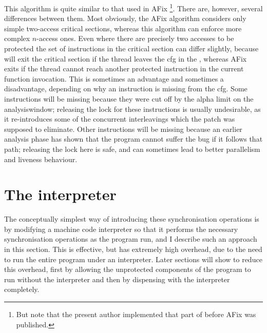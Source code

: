 This algorithm is quite similar to that used in AFix
\cite{Jin2011}\footnote{But note that the present author implemented
  that part of {\implementation} before AFix was published.}.  There
are, however, several differences between them.  Most obviously, the
AFix algorithm considers only simple two-access critical sections,
whereas this algorithm can enforce more complex $n$-access ones.  Even
where there are precisely two accesses to be protected the set of
instructions in the critical section can differ slightly, because
{\technique} will exit the critical section if the thread leaves the
\gls{cfg} in the {\StateMachine}, whereas AFix exits if the thread
cannot reach another protected instruction in the current function
invocation.  This is sometimes an advantage and sometimes a
disadvantage, depending on why an instruction is missing from the
{\StateMachine} \gls{cfg}.  Some instructions will be missing because
they were cut off by the \gls{alpha} limit on the
\gls{analysiswindow}; releasing the lock for these instructions is
usually undesirable, as it re-introduces some of the concurrent
interleavings which the patch was supposed to eliminate.  Other
instructions will be missing because an earlier analysis phase has
shown that the program cannot suffer the bug if it follows that path;
releasing the lock here is safe, and can sometimes lead to better
parallelism and liveness behaviour.

\section{The interpreter}

The conceptually simplest way of introducing these synchronisation
operations is by modifying a machine code interpreter so that it
performs the necessary synchronisation operations as the program run,
and I describe such an approach in this section.  This is effective,
but has extremely high overhead, due to the need to run the entire
program under an interpreter.  Later sections will show to reduce this
overhead, first by allowing the unprotected components of the program
to run without the interpreter and then by dispensing with the
interpreter completely.

